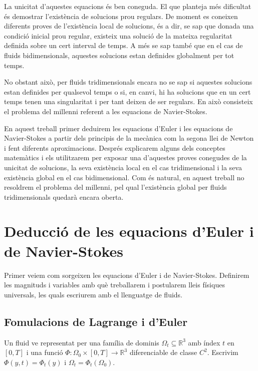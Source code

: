 \documentclass{article}
\numberwithin{equation}{section}
\begin{document}
La unicitat d'aquestes equacions \'{e}s ben coneguda. El que planteja m\'{e}s dificultat \'{e}s demostrar l'exist\`{e}ncia de solucions prou regulars. De moment es coneixen diferents proves de l'exist\`{e}ncia local de solucions, \'{e}s a dir, se sap que donada una condici\'{o} inicial prou regular, existeix una soluci\'{o} de la mateixa regularitat definida sobre un cert interval de temps. A m\'{e}s se sap tamb\'{e} que en el cas de fluids bidimensionals, aquestes solucions estan definides globalment per tot temps.

No obstant aix\`{o}, per fluids tridimensionals encara no se sap si aquestes solucions estan definides per qualsevol temps o si, en canvi, hi ha solucions que en un cert temps tenen una singularitat i per tant deixen de ser regulars. En aix\`{o} consisteix el problema del mil\textperiodcentered lenni referent a les equacions de Navier-Stokes.

En aquest treball primer deduirem les equacions d'Euler i les equacions de Navier-Stokes a partir dels principis de la mec\`{a}nica com la segona llei de Newton i fent diferents aproximacions. Despr\'{e}s explicarem alguns dels conceptes matem\`{a}tics i els utilitzarem per exposar una d'aquestes proves conegudes de la unicitat de solucions, la seva exist\`{e}ncia local en el cas tridimensional i la seva exist\`{e}ncia global en el cas bidimensional. Com \'{e}s natural, en aquest treball no resoldrem el problema del mil\textperiodcentered lenni, pel qual l'exist\`{e}ncia global per fluids tridimensionals quedar\`{a} encara oberta.

\section{Deducci\'{o} de les equacions d'Euler i de Navier-Stokes}

Primer veiem com sorgeixen les equacions d'Euler i de Navier-Stokes. Definirem les magnituds i variables amb qu\`{e} treballarem i postularem lleis f\'{i}siques universals, les quals escriurem amb el llenguatge de fluids.

\subsection{Fomulacions de Lagrange i d'Euler}

Un fluid ve representat per una fam\'{i}lia de dominis $\Omega_t\subseteq\mathbb{R}^3$ amb \'{i}ndex $t$ en $[0,T]$ i una funci\'{o} $\Phi:\Omega_0\times[0,T]\rightarrow\mathbb{R}^3$ diferenciable de classe $C^2$. Escrivim $\Phi(y,t)=\Phi_t(y)$ i $\Omega_t=\Phi_t(\Omega_0)$.
\end{document}
